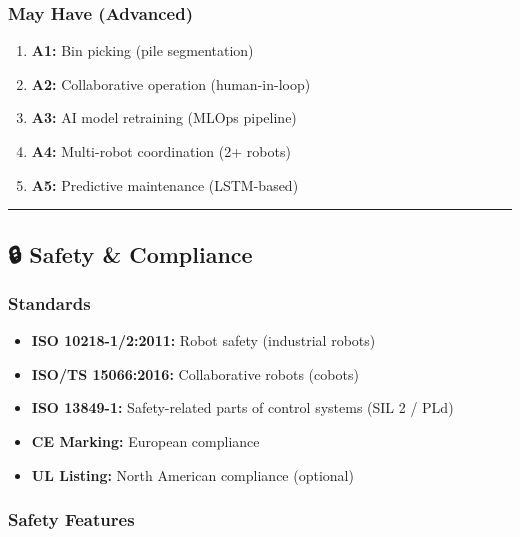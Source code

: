 \documentclass[
]{article}
\providecommand{\tightlist}{%
  \setlength{\itemsep}{0pt}\setlength{\parskip}{0pt}}
\begin{document}
\hypertarget{may-have-advanced}{%
\subsubsection{May Have (Advanced)}\label{may-have-advanced}}

\begin{enumerate}
\def\labelenumi{\arabic{enumi}.}
\setcounter{enumi}{11}
\tightlist
\item
  \textbf{A1:} Bin picking (pile segmentation)
\item
  \textbf{A2:} Collaborative operation (human-in-loop)
\item
  \textbf{A3:} AI model retraining (MLOps pipeline)
\item
  \textbf{A4:} Multi-robot coordination (2+ robots)
\item
  \textbf{A5:} Predictive maintenance (LSTM-based)
\end{enumerate}

\begin{center}\rule{0.5\linewidth}{0.5pt}\end{center}

\hypertarget{safety-compliance}{%
\subsection{🔒 Safety \& Compliance}\label{safety-compliance}}

\hypertarget{standards}{%
\subsubsection{Standards}\label{standards}}

\begin{itemize}
\tightlist
\item
  \textbf{ISO 10218-1/2:2011:} Robot safety (industrial robots)
\item
  \textbf{ISO/TS 15066:2016:} Collaborative robots (cobots)
\item
  \textbf{ISO 13849-1:} Safety-related parts of control systems (SIL 2 /
  PLd)
\item
  \textbf{CE Marking:} European compliance
\item
  \textbf{UL Listing:} North American compliance (optional)
\end{itemize}

\hypertarget{safety-features}{%
\subsubsection{Safety Features}\label{safety-features}}
\end{document}
